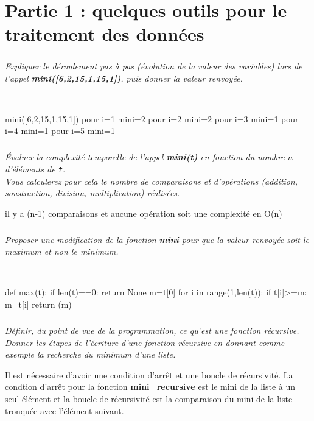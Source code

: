 \documentclass[10pt,fleqn]{article} %
\begin{document}

\vspace{1.7cm}
\pagestyle{fancy}
\thispagestyle{plain}

\section*{Partie 1 : quelques outils pour le traitement des données}

\subparagraph{}
\textit{Expliquer le déroulement pas à pas (évolution de la valeur des
  variables) lors de l'appel   \textbf{mini([6,2,15,1,15,1])}, puis donner la valeur   renvoyée.}
	
\ifprof
\begin{corrige}~\
\begin{python}
mini([6,2,15,1,15,1])
pour i=1 mini=2
pour i=2 mini=2
pour i=3 mini=1
pour i=4 mini=1
pour i=5 mini=1
\end{python}
\end{corrige}
\else
\fi

\subparagraph{}
\textit{Évaluer la complexité temporelle de l'appel \textbf{mini(t)} en fonction du nombre $n$ 
d'éléments de  \texttt{t}.\\
Vous calculerez pour cela le nombre de comparaisons et d'opérations (addition, soustraction, division, multiplication) réalisées.}

\ifprof
\begin{corrige}
il y a (n-1) comparaisons et aucune opération soit une complexité en O(n)
\end{corrige}
\else
\fi

\subparagraph{}
 \textit{Proposer une modification de la fonction \textbf{mini} pour que la valeur
  renvoyée soit le \emph{maximum} et non le \emph{minimum}.}
	
\ifprof
\begin{corrige}~\
\begin{python}
def max(t):
    if len(t)==0:
        return None
    m=t[0]
    for i in range(1,len(t)):
        if t[i]>=m:
            m=t[i]
    return (m)
\end{python}
\end{corrige}
\else
\fi
	
\subparagraph{}
\textit{Définir, du point de vue de la programmation, ce qu'est une fonction récursive. Donner les étapes de l'écriture d'une fonction récursive en donnant comme exemple la recherche du minimum d'une liste.}

\ifprof
\begin{corrige}
Il est nécessaire d'avoir une condition d'arrêt et une boucle de récursivité. La condtion d'arrêt pour la fonction \textbf{mini\_recursive} est le mini de la liste à un seul élément et la boucle de récursivité est la comparaison du mini de la liste tronquée avec l'élément suivant.
\end{corrige}
\else
\fi
	
\end{document}
